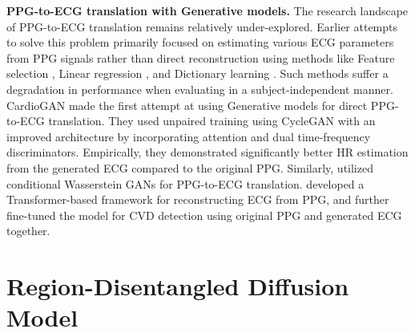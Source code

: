 \documentclass[letterpaper]{article} %
\begin{document}
\textbf{PPG-to-ECG translation with Generative models.}
The research landscape of PPG-to-ECG translation remains relatively under-explored. Earlier attempts to solve this problem primarily focused on estimating various ECG parameters from PPG signals rather than direct reconstruction using methods like Feature selection \cite{banerjee2014photoecg}, Linear regression \cite{zhu2021learning}, and Dictionary learning \cite{tian2022cross}. Such methods suffer a degradation in performance when evaluating in a subject-independent manner.
CardioGAN \cite{sarkar2021cardiogan} made the first attempt at using Generative models for direct PPG-to-ECG translation. They used unpaired training using CycleGAN \cite{zhu2017unpaired} with an improved architecture by incorporating attention and dual time-frequency discriminators. Empirically, they demonstrated significantly better HR estimation from the generated ECG compared to the original PPG. Similarly, \cite{vo2021p2e} utilized conditional Wasserstein GANs for PPG-to-ECG translation. \cite{lan2023performer} developed a Transformer-based framework for reconstructing ECG from PPG, and further fine-tuned the model for CVD detection using original PPG and generated ECG together.

\section{Region-Disentangled Diffusion Model}
\end{document}
